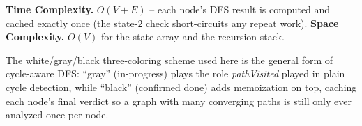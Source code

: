 \begin{complexitybox}
\textbf{Time Complexity.} $O(V+E)$ -- each node's DFS result is
computed and cached exactly once (the state-$2$ check short-circuits
any repeat work).
\textbf{Space Complexity.} $O(V)$ for the state array and the
recursion stack.
\end{complexitybox}

\begin{takeawaybox}
The white/gray/black three-coloring scheme used here is the general
form of cycle-aware DFS: ``gray'' (in-progress) plays the role
\textit{pathVisited} played in plain cycle detection, while ``black''
(confirmed done) adds memoization on top, caching each node's final
verdict so a graph with many converging paths is still only ever
analyzed once per node.
\end{takeawaybox}
